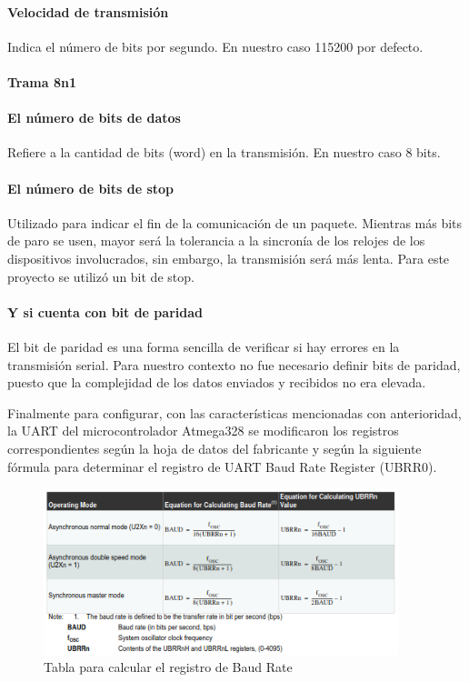 \paragraph*{Velocidad de transmisión}
    Indica el número de bits por segundo. En nuestro caso 115200 por defecto.
    \paragraph*{Trama 8n1}
    \par
    \paragraph*{El número de bits de datos}
    Refiere a la cantidad de bits (word) en la transmisión. En nuestro caso 8 bits.
    \par
    \paragraph*{El número de bits de stop}
    Utilizado para indicar el fin de la comunicación de un paquete. Mientras más bits de paro se usen, mayor será la tolerancia a la sincronía de los relojes de los dispositivos involucrados, sin embargo, la transmisión será más lenta. Para este proyecto se utilizó un bit de stop.
    \par
    \paragraph*{Y si cuenta con bit de paridad}
    El bit de paridad es una forma sencilla de verificar si hay errores en la transmisión serial. Para nuestro contexto no fue necesario definir bits de paridad, puesto que la complejidad de los datos enviados y recibidos no era elevada.
    \par
Finalmente para configurar, con las características mencionadas con anterioridad, la UART del microcontrolador Atmega328  se modificaron los registros correspondientes según la hoja de datos del fabricante y según la siguiente fórmula para determinar el registro de UART Baud Rate Register (UBRR0).
\begin{figure}[!htb]
  \begin{center}
    \includegraphics[width=0.92\textwidth]{imagenes/UARTbaudRateTable.png}
  \end{center}
  \caption{Tabla para calcular el registro de Baud Rate}
  \label{fig:baudRateTable}
\end{figure}
\FloatBarrier

